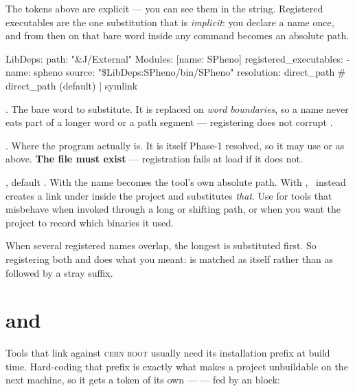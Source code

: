 The tokens above are explicit --- you can see them in the string. Registered executables
are the one substitution that is \emph{implicit}: you declare a name once, and from then
on that bare word inside any command becomes an absolute path.

\begin{yamlwin}
LibDeps:
  path: "&J/External"
  Modules: [{name: SPheno}]
  registered_executables:
    - name: spheno
      source: "\${LibDeps:SPheno}/bin/SPheno"
      resolution: direct_path      # direct_path (default) | symlink
\end{yamlwin}

\begin{keylist}
  \item[name] \req. The bare word to substitute. It is replaced on \emph{word
        boundaries}, so a name never eats part of a longer word or a path segment ---
        registering  does not corrupt .
  \item[source] \req. Where the program actually is. It is itself Phase-1 resolved, so it
        may use  or  as above. \textbf{The file
        must exist} --- registration fails at load if it does not.
  \item[resolution] \opt, default . With  the name
        becomes the tool's own absolute path. With , \Jtwo\ instead creates
        a link under  inside the project and substitutes
        \emph{that}. Use  for tools that misbehave when invoked through a
        long or shifting path, or when you want the project to record which binaries it
        used.
\end{keylist}

\begin{jnote}
When several registered names overlap, the longest is substituted first. So registering
both  and  does what you meant:  is
matched as itself rather than as  followed by a stray suffix.
\end{jnote}

\section{ and }
\label{sec:root-path}

Tools that link against \textsc{cern} \textsc{root} usually need its installation prefix
at build time. Hard-coding that prefix is exactly what makes a project unbuildable on the
next machine, so it gets a token of its own ---  --- fed by an
 block:

